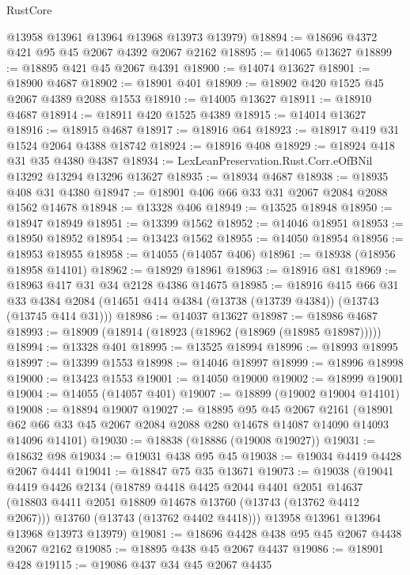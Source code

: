 \begin{lexlean}{RustCore}
\begin{coremodule}
      @13958
      @13961
      @13964
      @13968
      @13973
      @13979)
@18894 := @18696 @4372 @421 @95 @45 @2067 @4392 @2067 @2162
@18895 := @14065 @13627
@18899 := @18895 @421 @45 @2067 @4391
@18900 := @14074 @13627
@18901 := @18900 @4687
@18902 := @18901 @401
@18909 := @18902 @420 @1525 @45 @2067 @4389 @2088 @1553
@18910 := @14005 @13627
@18911 := @18910 @4687
@18914 := @18911 @420 @1525 @4389
@18915 := @14014 @13627
@18916 := @18915 @4687
@18917 := @18916 @64
@18923 := @18917 @419 @31 @1524 @2064 @4388 @18742
@18924 := @18916 @408
@18929 := @18924 @418 @31 @35 @4380 @4387
@18934 := LexLeanPreservation.Rust.Corr.eOfBNil @13292 @13294 @13296 @13627
@18935 := @18934 @4687
@18938 := @18935 @408 @31 @4380
@18947 := @18901 @406 @66 @33 @31 @2067 @2084 @2088 @1562 @14678
@18948 := @13328 @406
@18949 := @13525 @18948
@18950 := @18947 @18949
@18951 := @13399 @1562
@18952 := @14046 @18951
@18953 := @18950 @18952
@18954 := @13423 @1562
@18955 := @14050 @18954
@18956 := @18953 @18955
@18958 := @14055 (@14057 @406)
@18961 := @18938 (@18956 @18958 @14101)
@18962 := @18929 @18961
@18963 := @18916 @81
@18969 := @18963 @417 @31 @34 @2128 @4386 @14675
@18985 := @18916
    @415
    @66
    @31
    @33
    @4384
    @2084
    (@14651 @414 @4384 (@13738 (@13739 @4384)) (@13743 (@13745 @414 @31)))
@18986 := @14037 @13627
@18987 := @18986 @4687
@18993 := @18909 (@18914 (@18923 (@18962 (@18969 (@18985 @18987)))))
@18994 := @13328 @401
@18995 := @13525 @18994
@18996 := @18993 @18995
@18997 := @13399 @1553
@18998 := @14046 @18997
@18999 := @18996 @18998
@19000 := @13423 @1553
@19001 := @14050 @19000
@19002 := @18999 @19001
@19004 := @14055 (@14057 @401)
@19007 := @18899 (@19002 @19004 @14101)
@19008 := @18894 @19007
@19027 := @18895
    @95
    @45
    @2067
    @2161
    (@18901 @62 @66 @33 @45 @2067 @2084 @2088 @280 @14678 @14087 @14090 @14093 @14096 @14101)
@19030 := @18838 (@18886 (@19008 @19027))
@19031 := @18632 @98
@19034 := @19031 @438 @95 @45
@19038 := @19034 @4419 @4428 @2067 @4441
@19041 := @18847 @75 @35 @13671
@19073 := @19038
    (@19041
      @4419
      @4426
      @2134
      (@18789
        @4418
        @4425
        @2044
        @4401
        @2051
        @14637
        (@18803 @4411 @2051 @18809 @14678 @13760 (@13743 (@13762 @4412 @2067)))
        @13760
        (@13743 (@13762 @4402 @4418)))
      @13958
      @13961
      @13964
      @13968
      @13973
      @13979)
@19081 := @18696 @4428 @438 @95 @45 @2067 @4438 @2067 @2162
@19085 := @18895 @438 @45 @2067 @4437
@19086 := @18901 @428
@19115 := @19086
    @437
    @34
    @45
    @2067
    @4435

\end{coremodule}
\end{lexlean}
